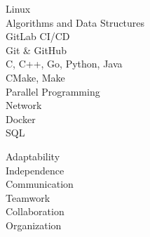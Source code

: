\documentclass[10pt, a4paper]{article}
\begin{document}
\hfill %
\begin{minipage}[t]{0.35\textwidth}
\raggedright

\begin{minipage}[t]{0.45\textwidth}
    \small
    Linux \\[4pt]
    Algorithms and Data Structures \\[4pt]
    GitLab CI/CD \\[4pt]
    Git \& GitHub \\[4pt]
    C, C++, Go, Python, Java \\[4pt]
    CMake, Make \\[4pt]
    Parallel Programming \\[4pt]
    Network \\[4pt]
    Docker \\[4pt]
    SQL \\[4pt]
\end{minipage}%
\hfill
\begin{minipage}[t]{0.45\textwidth}
    \small
    Adaptability \\[4pt]
    Independence \\[4pt]
    Communication \\ [4pt]
    Teamwork \\[4pt]
    Collaboration \\[4pt]
    Organization \\[4pt]
\end{minipage}

\small
{}


\end{minipage}
\end{document}
